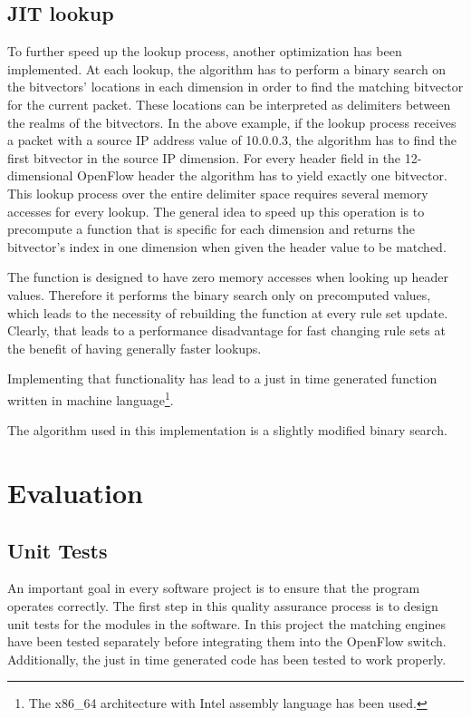 \documentclass[a4paper,
		12pt,
		parskip=full,
		titlepage
		]{scrartcl}
\begin{document}
\subsection{JIT lookup}
To further speed up the lookup process, another optimization has been implemented.
At each lookup, the algorithm has to perform a binary search on the bitvectors' locations in each dimension in order to find the matching bitvector for the current packet.
These locations can be interpreted as delimiters between the realms of the bitvectors.
In the above example, if the lookup process receives a packet with a source IP address value of 10.0.0.3, the algorithm has to find the first bitvector in the source IP dimension. %
For every header field in the 12-dimensional OpenFlow header the algorithm has to yield exactly one bitvector.
This lookup process over the entire delimiter space requires several memory accesses for every lookup.
The general idea to speed up this operation is to precompute a function that is specific for each dimension and returns the bitvector's index in one dimension when given the header value to be matched.

The function is designed to have zero memory accesses when looking up header values.
Therefore it performs the binary search only on precomputed values, which leads to the necessity of rebuilding the function at every rule set update.
Clearly, that leads to a performance disadvantage for fast changing rule sets at the benefit of having generally faster lookups.

Implementing that functionality has lead to a just in time generated function written in machine 
language\footnote{The x86\_64 architecture with Intel assembly language has been used.}.

The algorithm used in this implementation is a slightly modified binary search.

\section{Evaluation}
\subsection{Unit Tests}
An important goal in every software project is to ensure that the program operates correctly.
The first step in this quality assurance process is to design unit tests for the modules in the software.
In this project the matching engines have been tested separately before integrating them into the OpenFlow switch.
Additionally, the just in time generated code has been tested to work properly.
\end{document}
